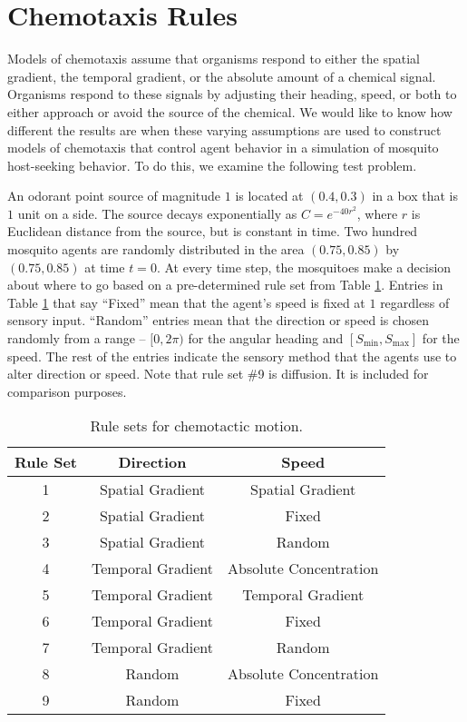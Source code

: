 \documentclass{article}
\begin{document}
\section*{Chemotaxis Rules}

Models of chemotaxis assume that organisms respond to either the spatial gradient, the temporal gradient, or the absolute amount of a chemical signal. Organisms respond to these signals by adjusting their heading, speed, or both to either approach or avoid the source of the chemical. We would like to know how different the results are when these varying assumptions are used to construct models of chemotaxis that control agent behavior in a simulation of mosquito host-seeking behavior. To do this, we examine the following test problem.

An odorant point source of magnitude $1$ is located at $(0.4,0.3)$ in a box that is $1$ unit on a side. The source decays exponentially as $ C = e^{-40r^2}$, where $r$ is Euclidean distance from the source, but is constant in time. Two hundred mosquito agents are randomly distributed in the area $(0.75,0.85)$ by $(0.75,0.85)$ at time $t=0$. At every time step, the mosquitoes make a decision about where to go based on a pre-determined rule set from Table \ref{rulesets}. Entries in Table \ref{rulesets} that say ``Fixed'' mean that the agent's speed is fixed at $1$ regardless of sensory input. ``Random'' entries mean that the direction or speed is chosen randomly from a range -- $[0,2\pi)$ for the angular heading and $[S_{\mbox{min}},S_{\mbox{max}}]$ for the speed. The rest of the entries indicate the sensory method that the agents use to alter direction or speed. Note that rule set \#9 is diffusion. It is included for comparison purposes.

\begin{table}[h]\label{rulesets}
	\begin{centering}
\begin{tabular}{|c|c|c|}
	\hline
	Rule Set &  Direction & Speed \\
	\hline
	 1 & Spatial Gradient & Spatial Gradient\\
	 2 & Spatial Gradient & Fixed\\
	 3 & Spatial Gradient & Random\\
	 4 & Temporal Gradient & Absolute Concentration\\
	 5 & Temporal Gradient & Temporal Gradient\\
	 6 & Temporal Gradient & Fixed\\
	 7 & Temporal Gradient & Random\\
	 8 & Random & Absolute Concentration\\
	 9 & Random & Fixed\\
\hline                                                  
\end{tabular}
\caption{Rule sets for chemotactic motion.}
\end{centering}
\end{table}
  
\end{document}
